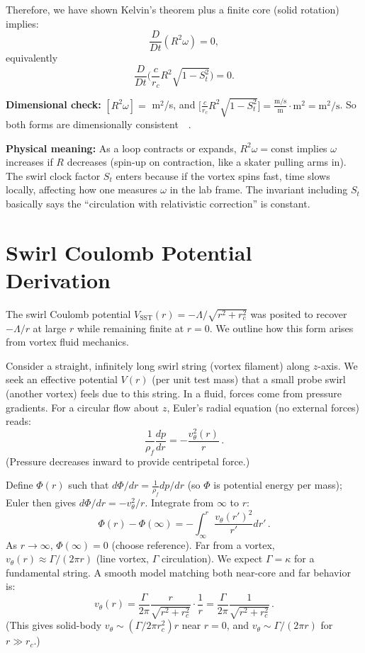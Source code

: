 \documentclass[aps,onecolumn,10pt,nofootinbib]{revtex4}
\begin{document}
	Therefore, we have shown Kelvin’s theorem plus a finite core (solid rotation) implies:
	\[
		\frac{D}{Dt}(R^2 \omega) = 0,
	\]
	equivalently
	\[
		\frac{D}{Dt}\Big(\frac{c}{r_c}R^2\sqrt{1 - S_t^2}\Big) = 0.
	\]

	\noindent\textbf{Dimensional check:} $[R^2 \omega] =$ m$^2$/s, and
	$\big[\frac{c}{r_c}R^2\sqrt{1 - S_t^2}\big] = \frac{\text{m/s}}{\text{m}} \cdot \text{m}^2 = \text{m}^2/\text{s}$. So both forms are dimensionally consistent~\cite{index115}~\cite{index116}.

	\noindent\textbf{Physical meaning:} As a loop contracts or expands, $R^2 \omega = \text{const}$ implies $\omega$ increases if $R$ decreases (spin-up on contraction, like a skater pulling arms in). The swirl clock factor $S_t$ enters because if the vortex spins fast, time slows locally, affecting how one measures $\omega$ in the lab frame. The invariant including $S_t$ basically says the “circulation with relativistic correction” is constant.

	\section{Swirl Coulomb Potential Derivation}
	The swirl Coulomb potential $V_{\text{SST}}(r) = -\Lambda/\sqrt{r^2 + r_c^2}$ was posited to recover $- \Lambda/r$ at large $r$ while remaining finite at $r=0$. We outline how this form arises from vortex fluid mechanics.

	Consider a straight, infinitely long swirl string (vortex filament) along $z$-axis. We seek an effective potential $V(r)$ (per unit test mass) that a small probe swirl (another vortex) feels due to this string. In a fluid, forces come from pressure gradients. For a circular flow about $z$, Euler’s radial equation (no external forces) reads:
	\[
		\frac{1}{\rho_f}\frac{dp}{dr} = -\frac{v_{\theta}^2(r)}{r}\,.
	\]
	(Pressure decreases inward to provide centripetal force.)

	Define $\Phi(r)$ such that $d\Phi/dr = \frac{1}{\rho_f}dp/dr$ (so $\Phi$ is potential energy per mass); Euler then gives $d\Phi/dr = -v_{\theta}^2/r$. Integrate from $\infty$ to $r$:
	\[
		\Phi(r) - \Phi(\infty) = -\int_{\infty}^{r} \frac{v_{\theta}(r')^2}{r'} dr'\,.
	\]
	As $r\to\infty$, $\Phi(\infty)=0$ (choose reference). Far from a vortex, $v_{\theta}(r) \approx \Gamma/(2\pi r)$ (line vortex, $\Gamma$ circulation). We expect $\Gamma = \kappa$ for a fundamental string. A smooth model matching both near-core and far behavior is:
	\[
		v_{\theta}(r) = \frac{\Gamma}{2\pi}\frac{r}{\sqrt{r^2+r_c^2}}\cdot\frac{1}{r} = \frac{\Gamma}{2\pi}\frac{1}{\sqrt{r^2+r_c^2}}\,.
	\]
	(This gives solid-body $v_{\theta}\sim (\Gamma/2\pi r_c^2)r$ near $r=0$, and $v_{\theta}\sim \Gamma/(2\pi r)$ for $r\gg r_c$.)
\end{document}
